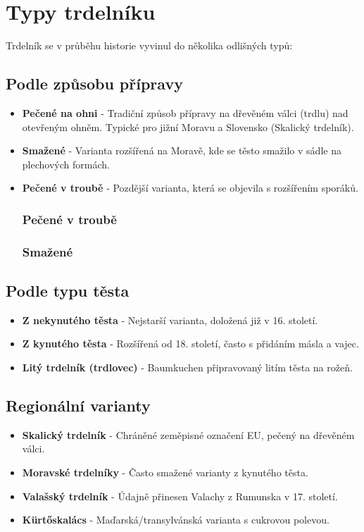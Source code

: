 \documentclass[a5paper,10pt]{book}
\begin{document}
\chapter{Typy trdelníku}
Trdelník se v průběhu historie vyvinul do několika odlišných typů:

\section{Podle způsobu přípravy}
\begin{itemize}
\item \textbf{Pečené na ohni} - Tradiční způsob přípravy na dřevěném válci (trdlu) nad otevřeným ohněm. Typické pro jižní Moravu a Slovensko (Skalický trdelník).
\item \textbf{Smažené} - Varianta rozšířená na Moravě, kde se těsto smažilo v sádle na plechových formách.
\item \textbf{Pečené v troubě} - Pozdější varianta, která se objevila s rozšířením sporáků.

\subsection{Pečené v troubě}

\lipsum[1-3]

\subsection{Smažené}

\lipsum[4-6]

\end{itemize}

\section{Podle typu těsta}
\begin{itemize}
\item \textbf{Z nekynutého těsta} - Nejstarší varianta, doložená již v 16. století.
\item \textbf{Z kynutého těsta} - Rozšířená od 18. století, často s přidáním másla a vajec.
\item \textbf{Litý trdelník (trdlovec)} - Baumkuchen připravovaný litím těsta na rožeň.
\end{itemize}

\section{Regionální varianty}
\begin{itemize}
\item \textbf{Skalický trdelník} - Chráněné zeměpisné označení EU, pečený na dřevěném válci.
\item \textbf{Moravské trdelníky} - Často smažené varianty z kynutého těsta.
\item \textbf{Valašský trdelník} - Údajně přinesen Valachy z Rumunska v 17. století.
\item \textbf{Kürtőskalács} - Maďarská/transylvánská varianta s cukrovou polevou.
\end{itemize}
\end{document}
